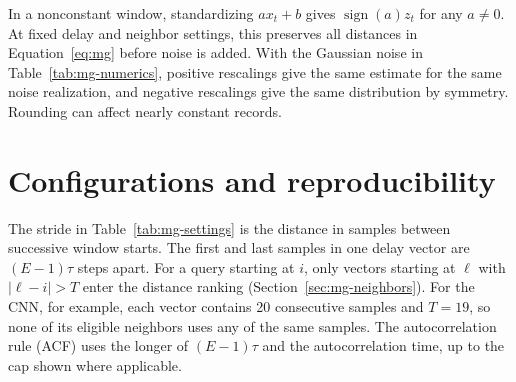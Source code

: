{In a nonconstant window, standardizing $ax_t+b$ gives $\operatorname{sign}(a)z_t$ for any $a\ne0$. At fixed delay and neighbor settings, this preserves all distances in Equation~\eqref{eq:mg} before noise is added. With the Gaussian noise in Table~\ref{tab:mg-numerics}, positive rescalings give the same estimate for the same noise realization, and negative rescalings give the same distribution by symmetry. Rounding can affect nearly constant records.

\section{Configurations and reproducibility}\label{app:settings}
The stride in Table~\ref{tab:mg-settings} is the distance in samples between successive window starts. The first and last samples in one delay vector are $(E-1)\tau$ steps apart. For a query starting at $i$, only vectors starting at $\ell$ with $|\ell-i|>T$ enter the distance ranking (Section~\ref{sec:mg-neighbors}). For the CNN, for example, each vector contains 20 consecutive samples and $T=19$, so none of its eligible neighbors uses any of the same samples. The autocorrelation rule (ACF) uses the longer of $(E-1)\tau$ and the autocorrelation time, up to the cap shown where applicable.

}

